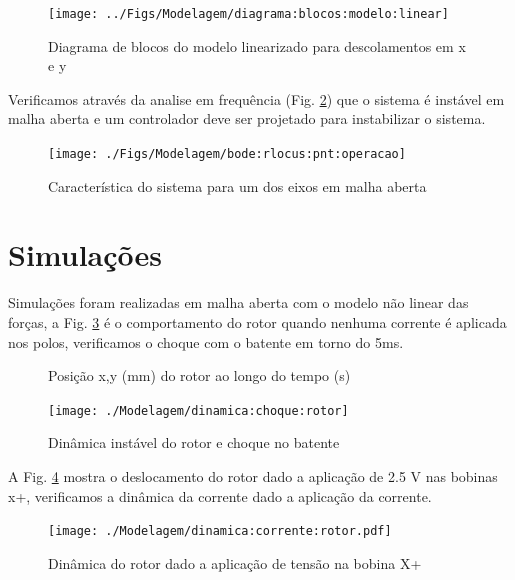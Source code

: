 \begin{figure}[th!]
\centering
\texttt{[image: ../Figs/Modelagem/diagrama:blocos:modelo:linear]}
\caption{Diagrama de blocos do modelo linearizado para descolamentos em x e y}
\label{fig:diagrama:blocos:modelo:linear}
\end{figure}

Verificamos através da analise em frequência (Fig. \ref{fig:bode:rlocus:pnt:operacao}) que o sistema é instável em malha aberta e um controlador deve ser projetado para instabilizar o sistema.	

\begin{figure}[th!]
\centering
\texttt{[image: ./Figs/Modelagem/bode:rlocus:pnt:operacao]}
\caption{Característica do sistema para um dos eixos em malha aberta}
\label{fig:bode:rlocus:pnt:operacao}
\end{figure}

\section{Simulações}

Simulações foram realizadas em malha aberta com o modelo não linear das forças,  a Fig. \ref{fig:dinamica:choque:rotor} é o comportamento do rotor quando nenhuma corrente é aplicada nos polos, verificamos  o choque com o batente em torno do 5ms.

\begin{figure}[th!]
\centering
\caption*{Posição x,y (mm) do rotor ao longo do tempo (s)}
\texttt{[image: ./Modelagem/dinamica:choque:rotor]}
\caption{Dinâmica instável do rotor e choque no batente}
\label{fig:dinamica:choque:rotor}
\end{figure}

A Fig. \ref{fig:dinamica:corrente:rotor} mostra o deslocamento do rotor dado a aplicação de 2.5 V nas bobinas x+,  verificamos a dinâmica da corrente dado a aplicação da corrente.

\begin{figure}[th!]
\centering
\texttt{[image: ./Modelagem/dinamica:corrente:rotor.pdf]}
\caption{Dinâmica do rotor dado a aplicação de tensão na bobina X+}
\label{fig:dinamica:corrente:rotor}
\end{figure}

